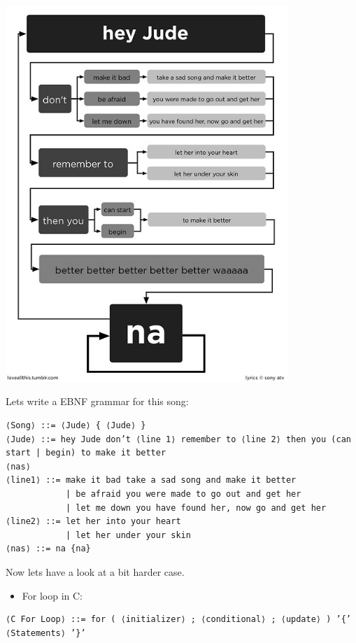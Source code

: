 \documentclass[11pt]{article}
\begin{document}
\begin{center}
\includegraphics[width=0.8\textwidth]{./figures/jude.jpg}
\label{fig1}
\end{center}

Lets write a EBNF grammar for this song:

\begin{verbatim}
⟨Song⟩ ::= ⟨Jude⟩ { ⟨Jude⟩ }
⟨Jude⟩ ::= hey Jude don’t ⟨line 1⟩ remember to ⟨line 2⟩ then you (can start | begin) to make it better
⟨nas⟩
⟨line1⟩ ::= make it bad take a sad song and make it better
            | be afraid you were made to go out and get her
            | let me down you have found her, now go and get her
⟨line2⟩ ::= let her into your heart
            | let her under your skin
⟨nas⟩ ::= na {na}
\end{verbatim}

Now lets have a look at a bit harder case.

\begin{itemize}
\item For loop in C:
\end{itemize}

\begin{verbatim}
⟨C For Loop⟩ ::= for ( ⟨initializer⟩ ; ⟨conditional⟩ ; ⟨update⟩ ) ’{’ ⟨Statements⟩ ’}’
\end{verbatim}
\end{document}
